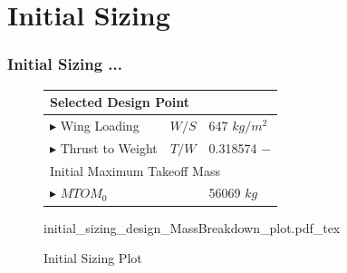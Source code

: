 
\section{Initial Sizing}
\begin{frame}
 \frametitle{Initial Sizing ...}
\begin{figure}
    \begin{minipage}[b]{0.48\textwidth}
        \begin{table}
        \tiny
        \begin{tabular}{lcl}
            \midrule[0.5pt]
            \multicolumn{3}{l}{Selected Design Point}\\
            \midrule[0.5pt]
            \textcolor{ilrdark}{$\blacktriangleright$}  Wing Loading & $W/S$ &647 $kg/m^{2}$\\
            \textcolor{ilrdark}{$\blacktriangleright$}  Thrust to Weight & $T/W$ & 0.318574 $-$\\
            \midrule[0.5pt]
            \multicolumn{3}{l}{Initial Maximum Takeoff Mass}\\
            \midrule[0.5pt]
            \textcolor{ilrdark}{$\blacktriangleright$}  $MTOM_0$ &  & 56069 $kg$\\
        \end{tabular}
        \end{table}
    \end{minipage}
    \begin{minipage}{0.5\textwidth}
        \tiny
        \def\svgwidth{5 cm}
        {initial_sizing_design_MassBreakdown_plot.pdf_tex}
        \caption{\footnotesize{Initial Sizing Plot}}
    \end{minipage}
\end{figure}
\end{frame}

